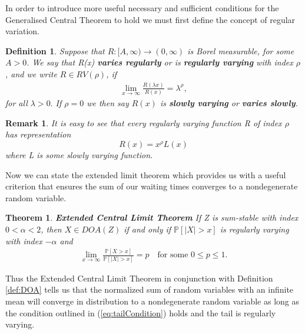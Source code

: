\documentclass[honours,12pt,twoside, openright]{unswthesis}
\newcommand{\PP}{\mathbb{P}}
\newcommand{\1}{\mathbf 1}
\newtheorem{theorem}[equation]{Theorem}
\newtheorem{definition}[equation]{Definition}
\newtheorem{remark}[equation]{Remark}
\numberwithin{equation}{section}
\theoremstyle{definition}
\theoremstyle{remark}
\begin{document}
In order to introduce more useful necessary and sufficient conditions for the Generalised Central Theorem to hold we must first define the concept of regular variation.
\begin{definition}\label{def:RV}
	Suppose that $R:[A,\infty)\to(0,\infty)$ is Borel measurable, for some $A>0$. We say that R(x) \textbf{varies regularly} or is \textbf{regularly varying} with index $\rho$, and we write $R\in RV(\rho)$, if
	\begin{align*}
	\lim_{x\to\infty}\frac{R(\lambda x)}{R(x)}=\lambda^\rho, 
	\end{align*}
	for all $\lambda>0.$ If $\rho=0$ we then say $R(x)$ is \textbf{slowly varying} or \textbf{varies slowly}.\\
\end{definition}
\begin{remark}
	It is easy to see that every regularly varying function R of index $\rho$ has representation
	\[
		R(x)=x^\rho L(x)
	\]
	where L is some slowly varying function.\\
\end{remark}
Now we can state the extended limit theorem which provides us with a useful criterion that ensures the sum of our waiting times converges to a nondegenerate random variable.
\begin{theorem}\label{th:ECLT}\cite[Th.~4.5]{MeerschaertSikorskii2012}
	\textbf{Extended Central Limit Theorem} If Z is sum-stable with index $0<\alpha<2$, then $X\in DOA(Z)$ if and only if $\PP[|X|>x]$ is regularly varying with index $-\alpha$ and
	\begin{align}\label{eq:tailCondition}
			\lim_{x\to\infty}\frac{\PP[X>x]}{\PP[|X|>x]}=p\quad\textrm{for some }0\leq p\leq1.
	\end{align}
\end{theorem}
\noindent Thus the Extended Central Limit Theorem in conjunction with Definition \ref{def:DOA} tells us that the normalized sum of random variables with an infinite mean will converge in distribution to a nondegenerate random variable as long as the condition outlined in (\ref{eq:tailCondition}) holds and the tail is regularly varying.
\end{document}
